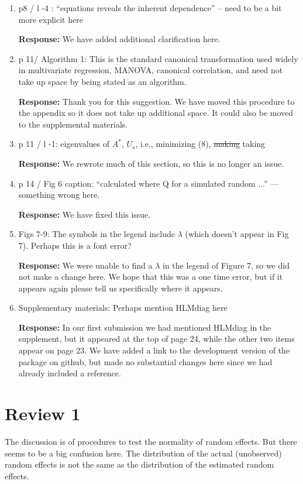 \documentclass[11pt]{article}
\begin{document}
\begin{enumerate}
\item p8 / l -4 : ``equations reveals the inherent dependence'' -- need to be a bit more explicit here

\textbf{Response:} We have added additional clarification here.

\item p 11/ Algorithm 1: This is the standard canonical transformation used widely in multivariate regression, MANOVA, canonical correlation, and need not take up space by being stated as an algorithm.

\textbf{Response:} Thank you for this suggestion. We have moved this procedure to the appendix so it does not take up additional space. It could also be moved to the supplemental materials.

\item p 11 / l -1: eigenvalues of $A^*$, $U_s$, i.e., minimizing (8), \sout{making} taking

\textbf{Response:} We rewrote much of this section, so this is no longer an issue.

\item p 14 / Fig 6 caption: ``calculated where Q for a simulated random ...'' --- something wrong
here.

\textbf{Response:} We have fixed this issue.

\item Figs 7-9: The symbols in the legend include $\lambda$ (which doesn't appear in Fig 7). Perhaps this is a font error?

\textbf{Response:} We were unable to find a $\lambda$ in the legend of Figure 7,  so we did not make a change here. We hope that this was a one time error, but if it appears again please tell us specifically where it appears.

\item Supplementary materials: Perhaps mention HLMdiag here

\textbf{Response:} In our first submission we had mentioned HLMdiag in the supplement, but it appeared at the top of page 24, while the other two items appear on page 23. We have added a link to the development version of the package on github, but made no substantial changes here since we had already included a reference.

\end{enumerate}


\section*{Review 1}
The discussion is of procedures to test the normality of random effects.  But there seems to be a big confusion here.  The distribution of the actual (unobserved) random effects is not the same as the distribution of the estimated random effects.
\end{document}
